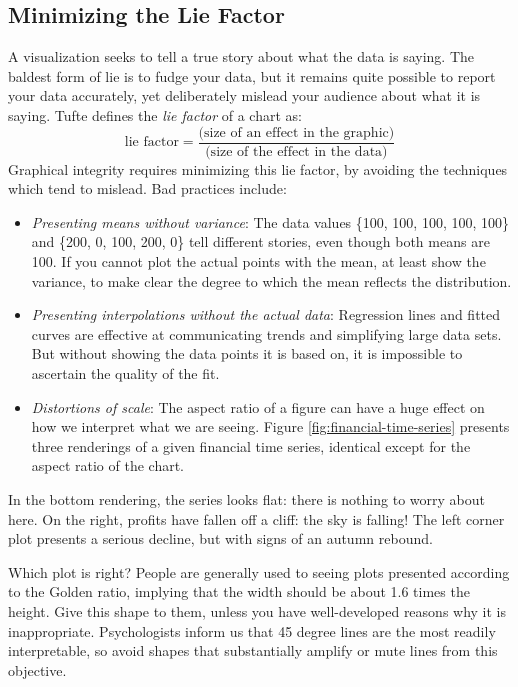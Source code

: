 \documentclass[10pt]{article}
\begin{document}
\subsection{Minimizing the Lie Factor}
A visualization seeks to tell a true story about what the data is saying. The baldest form of lie is to fudge your data, but it remains quite possible to report your data accurately, yet deliberately mislead your audience about what it is saying. Tufte defines the \emph{lie factor} of a chart as:
\[
\text{lie factor} = \frac{\text{(size of an effect in the graphic)}}{\text{(size of the effect in the data)}}
\]
Graphical integrity requires minimizing this lie factor, by avoiding the techniques which tend to mislead. Bad practices include:
\begin{itemize}
  \item \emph{Presenting means without variance}: The data values \{100, 100, 100, 100, 100\} and \{200, 0, 100, 200, 0\} tell different stories, even though both means are 100. If you cannot plot the actual points with the mean, at least show the variance, to make clear the degree to which the mean reflects the distribution.
  \item \emph{Presenting interpolations without the actual data}: Regression lines and fitted curves are effective at communicating trends and simplifying large data sets. But without showing the data points it is based on, it is impossible to ascertain the quality of the fit.
  \item \emph{Distortions of scale}: The aspect ratio of a figure can have a huge effect on how we interpret what we are seeing. Figure \ref{fig:financial-time-series} presents three renderings of a given financial time series, identical except for the aspect ratio of the chart.
\end{itemize}

In the bottom rendering, the series looks flat: there is nothing to worry about here. On the right, profits have fallen off a cliff: the sky is falling! The left corner plot presents a serious decline, but with signs of an autumn rebound.

Which plot is right? People are generally used to seeing plots presented according to the Golden ratio, implying that the width should be about 1.6 times the height. Give this shape to them, unless you have well-developed reasons why it is inappropriate. Psychologists inform us that 45 degree lines are the most readily interpretable, so avoid shapes that substantially amplify or mute lines from this objective.
\end{document}
